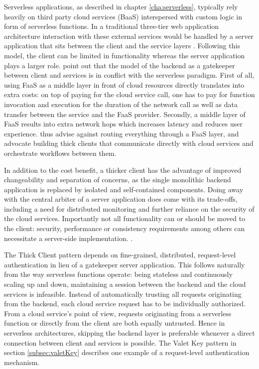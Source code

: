 Serverless applications, as described in chapter \ref{cha:serverless}, typically rely heavily on third party cloud services (BaaS) interspersed with custom logic in form of serverless functions. In a traditional three-tier web application architecture interaction with these external services would be handled by a server application that sits between the client and the service layers \parencite{robert2016serverlessarchitectures}. Following this model, the client can be limited in functionality whereas the server application plays a larger role. \textcite{sbarski2017serverless} point out that the model of the backend as a gatekeeper between client and services is in conflict with the serverless paradigm. First of all, using FaaS as a middle layer in front of cloud resources directly translates into extra costs: on top of paying for the cloud service call, one has to pay for function invocation and execution for the duration of the network call as well as data transfer between the service and the FaaS provider. Secondly, a middle layer of FaaS results into extra network hops which increases latency and reduces user experience. \textcite{sbarski2017serverless} thus advise against routing everything through a FaaS layer, and advocate building thick clients that communicate directly with cloud services and orchestrate workflows between them.

In addition to the cost benefit, a thicker client has the advantage of improved changeability and separation of concerns, as the single monolithic backend application is replaced by isolated and self-contained components. Doing away with the central arbiter of a server application does come with its trade-offs, including a need for distributed monitoring and further reliance on the security of the cloud services. Importantly not all functionality can or should be moved to the client: security, performance or consistency requirements among others can necessitate a server-side implementation. \parencite{robert2016serverlessarchitectures}.

The Thick Client pattern depends on fine-grained, distributed, request-level authentication in lieu of a gatekeeper server application. This follows naturally from the way serverless functions operate: being stateless and continuously scaling up and down, maintaining a session between the backend and the cloud services is infeasible. Instead of automatically trusting all requests originating from the backend, each cloud service request has to be individually authorized. From a cloud service's point of view, requests originating from a serverless function or directly from the client are both equally untrusted. Hence in serverless architectures, skipping the backend layer is preferable whenever a direct connection between client and services is possible. The Valet Key pattern in section \ref{subsec:valetKey} describes one example of a request-level authentication mechanism. \parencite{adzic2017serverless}


